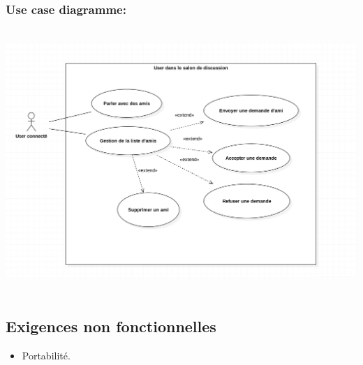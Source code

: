\documentclass[10pt,a4paper]{article}
\begin{document}
\subsubsection{Use case diagramme:}	
\begin{center}
    \includegraphics[height=10cm,width=15cm]{user_salon_de_discussion.png}
\end{center}

\subsection{Exigences non fonctionnelles}

\begin{itemize}
    \item Portabilité. 
\end{itemize}

\newpage
\end{document}
